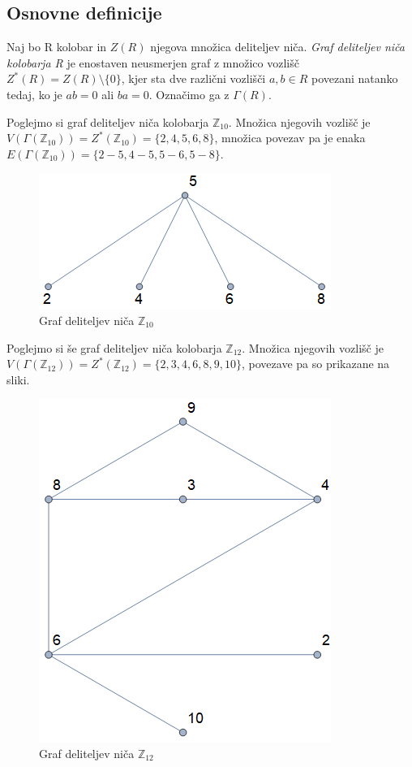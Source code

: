\documentclass[mat1, tisk]{fmfdelo}
\newcommand{\Z}{\mathbb Z}
\begin{document}
\subsection{Osnovne definicije}
%
\begin{definicija}
  Naj bo R kolobar in $Z(R)$ njegova množica deliteljev niča.
  \emph{Graf deliteljev niča kolobarja R} je enostaven neusmerjen graf z množico
  vozlišč $Z^{*}(R) = Z(R)\setminus\{0\} $, kjer sta dve različni vozlišči $a,b \in R $
  povezani natanko tedaj, ko je $ab = 0$ ali $ba = 0$. Označimo ga z $\Gamma(R)$.
\end{definicija}
%
\begin{zgled}\label{prim1}
  Poglejmo si graf deliteljev niča kolobarja $\Z_{10}$. Množica njegovih vozlišč je 
  $V(\Gamma(\Z_{10})) = Z^{*}(\Z_{10}) = \{2, 4, 5, 6, 8\}$, množica povezav pa 
  je enaka $E(\Gamma(\Z_{10})) = \{2 - 5, 4 - 5, 5 - 6, 5 - 8\}$.
  \begin{figure}[H]
    \centering
    \includegraphics[scale=0.5]{z10.png}
    \caption{Graf deliteljev niča $\Z_{10}$}
  \end{figure}
\end{zgled}
%
\begin{zgled}\label{zgled2.3}
  Poglejmo si še graf deliteljev niča kolobarja $\Z_{12}$. Množica njegovih vozlišč je 
  $V(\Gamma(\Z_{12})) = Z^{*}(\Z_{12}) = \{2, 3, 4, 6, 8, 9, 10\}$, povezave pa so 
  prikazane na sliki.
  \begin{figure}[H]
    \centering
    \includegraphics[scale=0.5]{z12.png}
    \caption{Graf deliteljev niča $\Z_{12}$}
  \end{figure}
\end{zgled}
\end{document}
